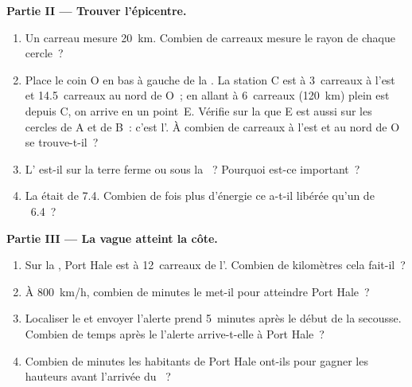 \begin{problem}
\medskip
\noindent\textbf{Partie II --- Trouver l'épicentre.}\par\nopagebreak
\begin{enumerate}[resume, beginpenalty=10000]
  \item Un carreau mesure \qty{20}{km}. Combien de carreaux mesure le rayon
        de chaque cercle~?
  \item Place le coin O en bas à gauche de la . La station C est à
        3~carreaux à l'est et 14.5~carreaux au nord de O~; en allant à
        6~carreaux (\qty{120}{km}) plein est depuis C, on arrive en un
        point~E. Vérifie sur la  que E est aussi sur les cercles de A
        et de B~: c'est l'. À combien de carreaux à l'est et au
        nord de O se trouve-t-il~?
  \item L' est-il sur la terre ferme ou sous la ~? Pourquoi
        est-ce important~?
  \item La  était de 7.4. Combien de fois plus d'énergie ce 
        a-t-il libérée qu'un  de ~6.4~?
\end{enumerate}

\medskip
\noindent\textbf{Partie III --- La vague atteint la côte.}\par\nopagebreak
\begin{enumerate}[resume, beginpenalty=10000]
  \item Sur la , Port Hale est à 12~carreaux de l'. Combien
        de kilomètres cela fait-il~?
  \item À \qty{800}{km/h}, combien de minutes le  met-il pour
        atteindre Port Hale~?
  \item Localiser le  et envoyer l'alerte prend 5~minutes après le
        début de la secousse. Combien de temps après le  l'alerte
        arrive-t-elle à Port Hale~?
  \item Combien de minutes les habitants de Port Hale ont-ils pour gagner
        les hauteurs avant l'arrivée du ~?
\end{enumerate}
\end{problem}
